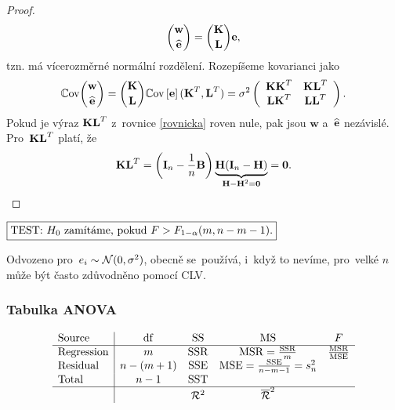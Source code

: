 \begin{proof}
 $$ \binom{\textbf{w}}{\heb} = \binom{\Km}{\Lm} \eb, $$
 tzn. má vícerozměrné normální rozdělení. Rozepíšeme kovarianci jako
  \begin{equation}\label{rovnicka}
  \Cov\binom{\textbf{w}}{\heb} = \binom{\Km}{\Lm}\Cov\left[\eb\right](\Km^T,\Lm^T) = \sigma^2 \left(\begin{array}{cc}
  \Km\Km^T&\Km\Lm^T  \\
  \Lm\Km^T & \Lm\Lm^T
  \end{array}
  \right).
  \end{equation}
  Pokud je výraz $\Km\Lm^T$ z~rovnice \eqref{rovnicka} roven nule, pak jsou $\textbf{w}$ a~$\heb$ nezávislé.
  Pro~$\Km\Lm^T$ platí, že
 $$ \Km\Lm^T = \left(\In-\frac{1}{n}\Bm \right)\underbrace{\Hm(\In-\Hm)}_{\Hm-\Hm^2 = \nula} = \nula. $$
\end{proof}

 $\test{F>F_{1-\alpha}(m,n-m-1)}$

 \begin{remark}
 	Odvozeno pro~$e_i\sim\NN(0,\sigma^2)$, obecně se~používá, i~když to nevíme, pro~velké $n$ může být často zdůvodněno pomocí CLV.
 \end{remark}
\subsubsection{Tabulka ANOVA}
 $$ \begin{array}{l|cccc}
\text{Source}& \mathrm{df} & \mathrm{SS} & \mathrm{MS} & F \\\hline
\text{Regression} & m & \SSR & \MSR = \frac{\SSR}{m} & \frac{\MSR}{\MSE} \\
\text{Residual} & n-(m+1) & \SSE & \MSE = \frac{\SSE}{n-m-1} = s_n^2 &  \\
\text{Total} & n-1 & \SST &  &  \\\hline
&  & \RR^2 & \overline{\RR}^2 &
\end{array}
 $$
